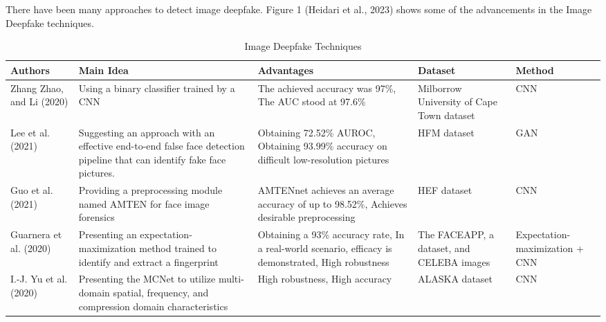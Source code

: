 
There have been many approaches to detect image deepfake. Figure 1 (Heidari et al., 2023) \cite{heidari2023deepfake}  shows some of the advancements in the Image Deepfake techniques.

\begin{table}
\caption{Image Deepfake Techniques}
\begin{tabularx}{\textwidth}{|X|X|X|X|X|}
  \hline
  \textbf{Authors} & \textbf{Main Idea} & \textbf{Advantages} & \textbf{Dataset} & \textbf{Method} \\ \hline
  Zhang Zhao, and Li (2020) \cite{zhang2020novel} & Using a binary classifier trained by a CNN & The achieved accuracy was 97\%, The AUC stood at 97.6\% & Milborrow University of Cape Town dataset & CNN \\ \hline
  Lee et al. (2021) \cite{lee2021detecting}& Suggesting an approach with an effective end-to-end false face detection pipeline  that can identify fake face pictures. & Obtaining 72.52\% AUROC, Obtaining 93.99\% accuracy on difficult low-resolution pictures & HFM dataset & GAN \\ \hline
  Guo et al. (2021) \cite{guo2021fake}& Providing a preprocessing module named AMTEN for face image forensics & AMTENnet achieves an average accuracy of up to 98.52\%, Achieves desirable preprocessing & HEF dataset & CNN \\ \hline
  Guarnera et al. (2020) \cite{guarnera2020fighting} & Presenting an expectation-maximization method trained to identify and extract a fingerprint & Obtaining a 93\% accuracy rate, In a real-world scenario, efficacy is demonstrated, High robustness & The FACEAPP, a dataset, and CELEBA images & Expectation-maximization + CNN \\ \hline
  I.-J. Yu et al. (2020) \cite{yu2020manipulation} & Presenting the MCNet to utilize multi-domain spatial, frequency, and compression domain characteristics & High robustness, High accuracy & ALASKA dataset & CNN \\ \hline
\end{tabularx}
\end{table}


